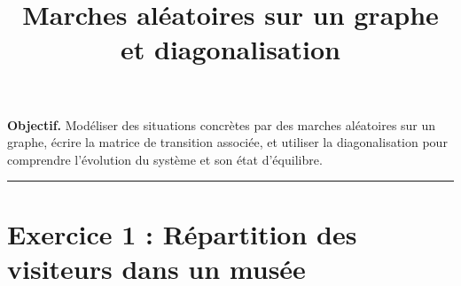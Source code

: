 

\usepackage{tikz, pgf}
\usetikzlibrary{arrows.meta, positioning, calc}
\newcommand{\R}{\mathbb{R}}
\newcommand{\N}{\mathbb{N}}

\title{Marches aléatoires sur un graphe et diagonalisation}
\author{}
\date{}


\maketitle

\noindent\textbf{Objectif.}
Modéliser des situations concrètes par des marches aléatoires sur un graphe, écrire la matrice de transition associée, et utiliser la diagonalisation pour comprendre l'évolution du système et son état d'équilibre.

\medskip
 

\vspace{1.5em}
\hrule
\vspace{1em}

\section*{Exercice 1 : Répartition des visiteurs dans un musée}

\medskip

